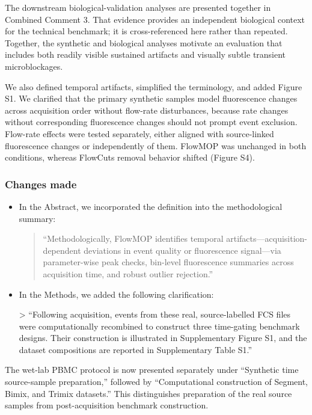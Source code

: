 \documentclass[
  11pt,
  a4paper,
]{article}
\begin{document}
The downstream biological-validation analyses are presented together in
Combined Comment 3. That evidence provides an independent biological
context for the technical benchmark; it is cross-referenced here rather
than repeated. Together, the synthetic and biological analyses motivate
an evaluation that includes both readily visible sustained artifacts and
visually subtle transient microblockages.

We also defined temporal artifacts, simplified the terminology, and
added Figure S1. We clarified that the primary synthetic samples model
fluorescence changes across acquisition order without flow-rate
disturbances, because rate changes without corresponding fluorescence
changes should not prompt event exclusion. Flow-rate effects were tested
separately, either aligned with source-linked fluorescence changes or
independently of them. FlowMOP was unchanged in both conditions, whereas
FlowCut\textquotesingle s removal behavior shifted (Figure S4).

\subsubsection{Changes made}\label{changes-made-8}

\begin{itemize}
\item
  In the Abstract, we incorporated the definition into the
  methodological summary:

  \begin{quote}
  ``Methodologically, FlowMOP identifies temporal
  artifacts---acquisition-dependent deviations in event quality or
  fluorescence signal---via parameter-wise peak checks, bin-level
  fluorescence summaries across acquisition time, and robust outlier
  rejection.''
  \end{quote}
\item
  In the Methods, we added the following clarification:

  {\color{revisionblue}\textgreater{} ``Following acquisition, events
  from these real, source-labelled FCS files were computationally
  recombined to construct three time-gating benchmark designs. Their
  construction is illustrated in Supplementary Figure S1, and the
  dataset compositions are reported in Supplementary Table S1.''}
\end{itemize}

{\color{revisionblue} The wet-lab PBMC protocol is now presented
separately under ``Synthetic time source-sample preparation,'' followed
by ``Computational construction of Segment, Bimix, and Trimix
datasets.'' This distinguishes preparation of the real source samples
from post-acquisition benchmark construction.}
\end{document}
